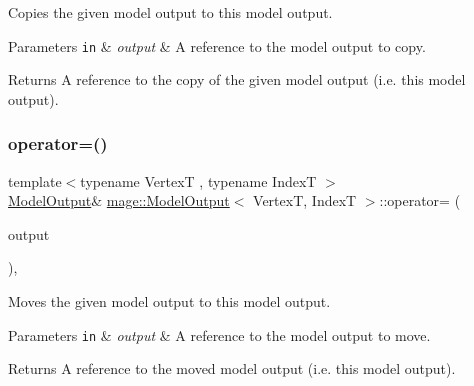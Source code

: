 Copies the given model output to this model output.


\begin{DoxyParams}[1]{Parameters}
\mbox{\tt in}  & {\em output} & A reference to the model output to copy. \\
\hline
\end{DoxyParams}
\begin{DoxyReturn}{Returns}
A reference to the copy of the given model output (i.\+e. this model output). 
\end{DoxyReturn}
\hypertarget{structmage_1_1_model_output_a090d74bebb6045c11952cc57fb1aa220}{}\label{structmage_1_1_model_output_a090d74bebb6045c11952cc57fb1aa220} 
\subsubsection{\texorpdfstring{operator=()}{operator=()}\hspace{0.1cm}{\footnotesize\ttfamily [2/2]}}
{\footnotesize\ttfamily template$<$typename VertexT , typename IndexT $>$ \\
\hyperlink{structmage_1_1_model_output}{Model\+Output}\& \hyperlink{structmage_1_1_model_output}{mage\+::\+Model\+Output}$<$ VertexT, IndexT $>$\+::operator= (\begin{DoxyParamCaption}\item[{\hyperlink{structmage_1_1_model_output}{Model\+Output}$<$ VertexT, IndexT $>$ \&\&}]{output }\end{DoxyParamCaption})\hspace{0.3cm}{\ttfamily [default]}, {\ttfamily [noexcept]}}

Moves the given model output to this model output.


\begin{DoxyParams}[1]{Parameters}
\mbox{\tt in}  & {\em output} & A reference to the model output to move. \\
\hline
\end{DoxyParams}
\begin{DoxyReturn}{Returns}
A reference to the moved model output (i.\+e. this model output). 
\end{DoxyReturn}
\hypertarget{structmage_1_1_model_output_a88f2dff99e178b84637ae945ba5f6f53}{}\label{structmage_1_1_model_output_a88f2dff99e178b84637ae945ba5f6f53} 
